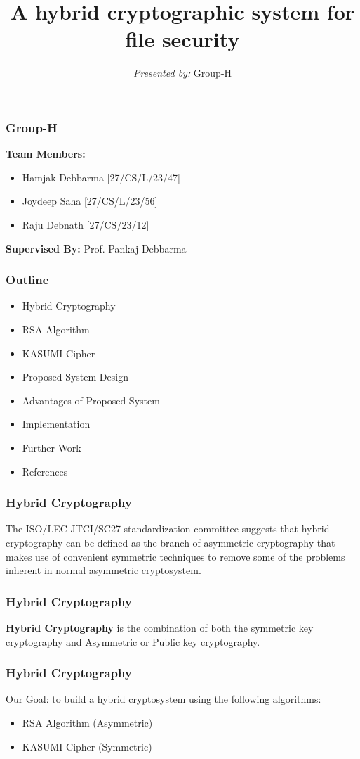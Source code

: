 \documentclass{beamer}
\title{A hybrid cryptographic system for file security}
\subtitle{}
\author{\textit{Presented by:} Group-H}
\institute[TIT]{
Dept. Of Computer Science and Engineering\\
Tripura Institute of Technology, Narsingarh\\
\medskip
}
\date{}
\begin{document}
\begin{frame}
\titlepage
\end{frame}

\begin{frame}[t]
	\frametitle{Group-H}
	\large \textbf{Team Members: }\\
	\begin{itemize}
		\item Hamjak Debbarma [27/CS/L/23/47]
		\item Joydeep Saha  [27/CS/L/23/56]
		\item Raju Debnath  [27/CS/23/12]
	\end{itemize}
\vspace{0.5in}
 \large \textbf{Supervised By: }  Prof. Pankaj Debbarma\\
\end{frame}


\begin{frame}
\frametitle{Outline}
\begin{itemize}
\item Hybrid Cryptography 
\item RSA Algorithm
\item KASUMI Cipher
\item Proposed System Design 
\item Advantages of Proposed System 
\item Implementation
\item Further Work
\item References
\end{itemize}
\end{frame}

\begin{frame}
\frametitle{Hybrid Cryptography}
 The ISO/LEC JTCI/SC27 standardization committee suggests that hybrid cryptography can be defined as the branch of asymmetric cryptography that makes use of convenient symmetric techniques to remove some of the problems inherent in normal asymmetric cryptosystem.
\end{frame}

\begin{frame}
\frametitle{Hybrid Cryptography}
\textbf{Hybrid Cryptography} is the combination of both the symmetric key cryptography and Asymmetric or Public key cryptography.
\end{frame}

\begin{frame}
	\frametitle{Hybrid Cryptography}
	Our Goal: to build a hybrid cryptosystem using the following algorithms:
	\vspace{0.2in}
	\begin{itemize}
		\item RSA Algorithm (Asymmetric)
		\item KASUMI Cipher (Symmetric)
	\end{itemize}
\end{frame}
\end{document}
